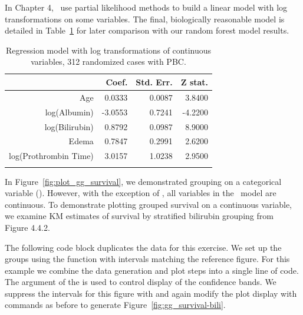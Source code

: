 \documentclass[nojss]{jss}\usepackage[]{graphicx}\usepackage[]{color}
\begin{document}
In Chapter 4,~\cite{fleming:1991} use partial likelihood methods to build a linear model with log transformations on some variables. The final, biologically reasonable model is detailed in Table~\ref{T:FHmodel} for later comparison with our random forest model results.

\begin{table}[ht]
\centering
{\footnotesize
\begin{tabular}{rrrr}
  \toprule
 & Coef. & Std. Err. & Z stat. \\ 
  \midrule
Age & 0.0333 & 0.0087 & 3.8400 \\ 
   \rowcolor[gray]{0.95}log(Albumin) & -3.0553 & 0.7241 & -4.2200 \\ 
  log(Bilirubin) & 0.8792 & 0.0987 & 8.9000 \\ 
   \rowcolor[gray]{0.95}Edema & 0.7847 & 0.2991 & 2.6200 \\ 
  log(Prothrombin Time) & 3.0157 & 1.0238 & 2.9500 \\ 
   \rowcolor[gray]{0.95} \bottomrule
\end{tabular}
}
\caption{Regression model with log transformations of continuous variables, 312 randomized cases with PBC.} 
\label{T:FHmodel}
\end{table}


In Figure~\ref{fig:plot_gg_survival}, we demonstrated grouping on a categorical variable (). However, with the exception of , all variables in the~\cite{fleming:1991} model are continuous. To demonstrate plotting grouped survival on a continuous variable, we examine KM estimates of survival by stratified bilirubin grouping from~\cite{fleming:1991} Figure 4.4.2. 

The following code block duplicates the  data for this exercise. We set up the  groups using the  function with intervals matching the reference figure. For this example we combine the data generation and plot steps into a single line of code. The  argument of the  is used to control display of the confidence bands. We suppress the intervals for this figure with  and again modify the plot display with  commands as before to generate Figure~\ref{fig:gg_survival-bili}.
\end{document}
